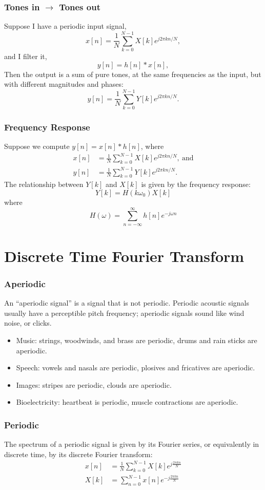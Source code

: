 \documentclass{beamer}
\begin{document}
\begin{frame}
  \frametitle{Tones in $\rightarrow$ Tones out}
  Suppose I have a periodic input signal,
  \[
  x[n] = \frac{1}{N}\sum_{k=0}^{N-1} X[k] e^{j2\pi kn/N},
  \]
  and I filter it,
  \[
  y[n]=h[n]\ast x[n],
  \]
  Then the output is a sum of pure tones, at the same frequencies as
  the input, but with different magnitudes and phases:
  \[
  y[n] = \frac{1}{N}\sum_{k=0}^{N-1} Y[k] e^{j2\pi kn/N}.
  \]
\end{frame}
\begin{frame}
  \frametitle{Frequency Response}
  Suppose we compute $y[n]=x[n]\ast h[n]$, where
  \begin{align*}
  x[n] &= \frac{1}{N}\sum_{k=0}^{N-1} X[k] e^{j2\pi kn/N},~\mbox{and}\\
  y[n] &= \frac{1}{N}\sum_{k=0}^{N-1} Y[k] e^{j2\pi kn/N}.
  \end{align*}
  The relationship between $Y[k]$ and $X[k]$ is given by the frequency
  response:
  \[
  Y[k] = H(k\omega_0) X[k]
  \]
  where
  \[
  H(\omega) = \sum_{n=-\infty}^\infty h[n]e^{-j\omega n}
  \]
\end{frame}
  
\section[DTFT]{Discrete Time Fourier Transform}
\setcounter{subsection}{1}

\begin{frame}
  \frametitle{Aperiodic}
  
  An ``aperiodic signal'' is a signal that is not periodic.  Periodic
  acoustic signals usually have a perceptible pitch frequency;
  aperiodic signals sound like wind noise, or clicks.
  \begin{itemize}
  \item Music: strings, woodwinds, and brass are periodic, drums and rain sticks are aperiodic.
  \item Speech: vowels and nasals are periodic, plosives and fricatives are aperiodic.
  \item Images: stripes are periodic, clouds are aperiodic.
  \item Bioelectricity: heartbeat is periodic, muscle contractions are aperiodic.
  \end{itemize}
\end{frame}

\begin{frame}
  \frametitle{Periodic}

  The spectrum of a periodic signal is given by its Fourier series, or equivalently in discrete
  time, by its discrete Fourier transform:
  \begin{align*}
    x[n] &= \frac{1}{N}\sum_{k=0}^{N-1} X[k] e^{j\frac{2\pi kn}{N}}\\
    X[k] &= \sum_{n=0}^{N-1} x[n] e^{-j\frac{2\pi kn}{N}}
  \end{align*}
\end{frame}
\end{document}

